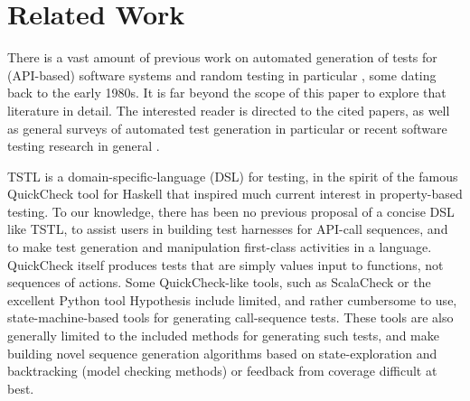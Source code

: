 \section{Related Work}
\label{sec:related}

There is a vast amount of previous work on automated generation of
tests for (API-based) software systems
\cite{Pacheco,FA11,GodefroidKS05} and random testing in particular
\cite{ICSEDiff,Pacheco,AMFL11,ARTChen,ISSTAART,FASE,HamletOnly,Hamlet94,ClaessenH00,CiupaLOM07,RandFormal,woda08,andrews-etal-rute-rt,ASE08,evalrand},
some dating back to the early 1980s. It is far beyond the scope of
this paper to explore that literature in detail.  The interested
reader is directed to the cited papers, as well as general surveys of
automated test generation in particular \cite{anand2013orchestrated}
or recent software testing research in general \cite{orsofuse}.  


TSTL is a domain-specific-language (DSL) \cite{Fow10} for testing, in
the spirit of the famous QuickCheck tool for Haskell
\cite{ClaessenH00} that inspired much current interest in
property-based testing.  To our knowledge, there has been no previous
proposal of a concise DSL like TSTL, to assist users in building test
harnesses for API-call sequences, and to make test generation and
manipulation first-class activities in a language.  QuickCheck itself
produces tests that are simply values input to functions, not sequences
of actions.  Some QuickCheck-like tools, such as ScalaCheck
\cite{ScalaCheck} or the excellent Python tool Hypothesis
\cite{hypothesis} include limited, and rather cumbersome to use,
state-machine-based tools for generating call-sequence tests.  These
tools are also generally limited to the included methods for
generating such tests, and make building novel sequence generation
algorithms based on state-exploration and backtracking (model checking
methods) or feedback from coverage difficult at best.

